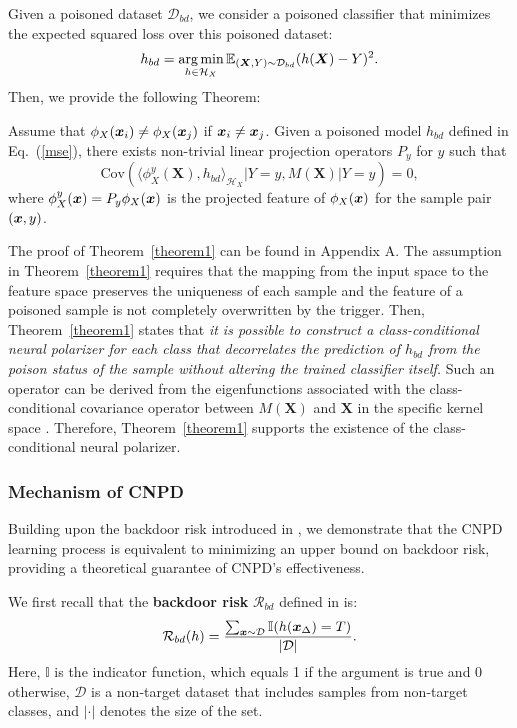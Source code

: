 Given a poisoned dataset $\mathcal{D}_{bd}$, 
we consider a poisoned classifier that  minimizes the expected squared loss over this poisoned dataset:
\begin{equation} 
\label{mse}
h_{bd} = \operatorname*{arg\,min}_{h\in\mathcal{H}_{X}}\mathbb{E}_{(\bm{X},Y)\sim\mathcal{D}_{bd}}(h(\bm{X})-Y)^2.
\end{equation}
Then, we provide the following Theorem: 

\begin{thm}
Assume that $\phi_{X}(\bm{x}_i)\neq \phi_{X}(\bm{x}_j)$ if $\bm{x}_i\neq \bm{x}_j$. Given a poisoned model $h_{bd}$ defined in Eq.~(\ref{mse}), there exists non-trivial linear projection operators $P_{y}$ for $y$ such that
$$\text{Cov}(\langle \phi^y_{X}(\bm{X}), h_{bd}\rangle_{\mathcal{H}_{X}}|Y=y, M(\bm{X})|Y=y)=0,$$
where $\phi^y_{X}(\bm{x}) = P_y\phi_{X}(\bm{x})$ is the projected feature of $\phi_{X}(\bm{x})$ for the sample pair $(\bm{x},y)$. 
\label{theorem1}
\end{thm}

The proof of Theorem~\ref{theorem1} can be found in Appendix A. The assumption in Theorem~\ref{theorem1} requires that the mapping from the input space to the feature space preserves the uniqueness of each sample and the feature of a poisoned sample is not completely overwritten by the trigger. Then, Theorem~\ref{theorem1} states that \emph{it is possible to construct a class-conditional neural polarizer for each class that decorrelates the prediction of $h_{bd}$ from the poison status of the sample without altering the trained classifier itself.}  Such an operator can be derived from the eigenfunctions associated with the class-conditional covariance operator between $M(\bm{X})$ and $\bm{X}$ in the specific kernel space \cite{wei2023mean}.  Therefore, Theorem~\ref{theorem1} supports the existence of the class-conditional neural polarizer.

\subsubsection{Mechanism of CNPD}
Building upon the backdoor risk introduced in \cite{wei2023shared}, we demonstrate that the CNPD learning process is equivalent to minimizing an upper bound on backdoor risk, providing a theoretical guarantee of CNPD’s effectiveness.

We first recall that the \textbf{backdoor risk} $\mathcal{R}_{bd}$ defined in \cite{wei2023shared} is:
\begin{align}
    \label{eq::bd_risk}
    \mathcal{R}_{bd}(h) = \frac{\sum_{\bm{x}\sim\mathcal{D}} \mathbb{I}(h(\bm{x}_{\Delta})=T)}{|\mathcal{D}|}.
\end{align}
Here, $\mathbb{I}$ is the indicator function, which equals 1 if the argument is true and 0 otherwise,  $\mathcal{D}$ is a non-target dataset that includes samples from non-target classes, and $|\cdot|$ denotes the size of the set.

